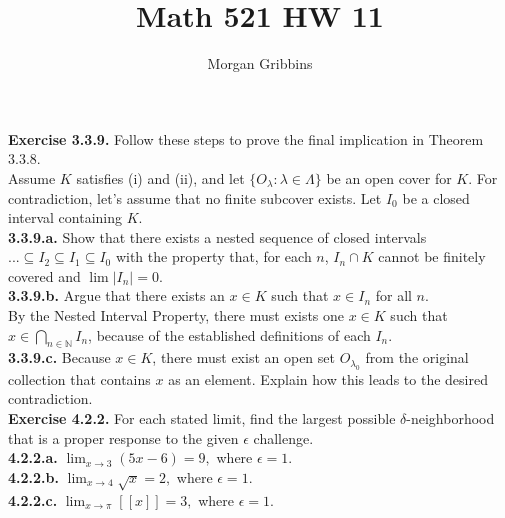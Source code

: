 \documentclass[12pt,letterpaper]{article}
\title{Math 521 HW 11}
\author{Morgan Gribbins}
\date{}
\begin{document}
	
\maketitle

\textbf{Exercise 3.3.9.} Follow these steps to prove the final implication in Theorem 3.3.8. \\

Assume \(K\) satisfies (i) and (ii), and let \(\{O_{\lambda} : \lambda \in \Lambda\}\) be an open cover for \(K\). For contradiction, let's assume that no finite subcover exists. Let \(I_{0}\) be a closed interval containing \(K\). \\

\textbf{3.3.9.a.} Show that there exists a nested sequence of closed intervals \(... \subseteq I_{2} \subseteq I_{1} \subseteq I_{0}\) with the property that, for each \(n\), \(I_{n} \cap K\) cannot be finitely covered and \(\lim |I_{n}| = 0.\) \\



\textbf{3.3.9.b.} Argue that there exists an \(x \in K\) such that \(x \in I_{n}\) for all \(n\). \\

By the Nested Interval Property, there must exists one \(x \in K\) such that \(x \in \bigcap_{n \in \mathbb{N}} I_{n}\), because of the established definitions of each \(I_{n}\).\\

\textbf{3.3.9.c.} Because \(x\in K\), there must exist an open set \(O_{\lambda_{0
}}\) from the original collection that contains \(x\) as an element. Explain how this leads to the desired contradiction. \\



\textbf{Exercise 4.2.2.} For each stated limit, find the largest possible \(\delta\)-neighborhood that is a proper response to the given \(\epsilon\) challenge. \\

\textbf{4.2.2.a.} \(\lim_{x \to 3} (5x - 6) = 9,\) where \(\epsilon = 1\). \\



\textbf{4.2.2.b.} \(\lim_{x \to 4} \sqrt{x} = 2,\) where \(\epsilon = 1\). \\



\textbf{4.2.2.c.} \(\lim_{x \to \pi} [[x]] = 3,\) where \(\epsilon = 1\). \\
\end{document}
